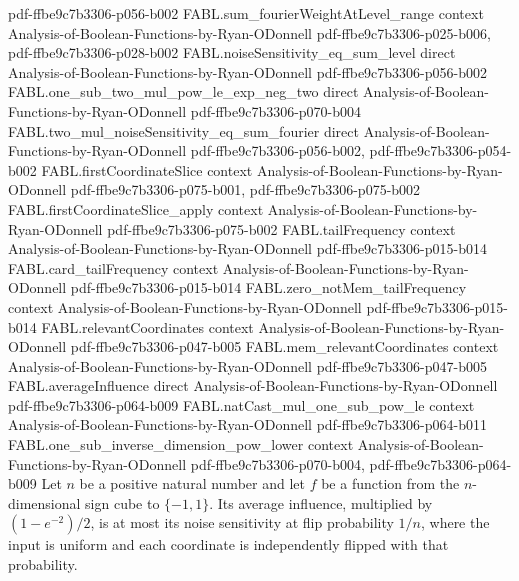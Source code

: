 \begin{theorem}
  {pdf-ffbe9c7b3306-p056-b002}
\proofstep
  {FABL.sum_fourierWeightAtLevel_range}
  {context}
  {Analysis-of-Boolean-Functions-by-Ryan-ODonnell}
  {pdf-ffbe9c7b3306-p025-b006,
    pdf-ffbe9c7b3306-p028-b002}
\proofstep
  {FABL.noiseSensitivity_eq_sum_level}
  {direct}
  {Analysis-of-Boolean-Functions-by-Ryan-ODonnell}
  {pdf-ffbe9c7b3306-p056-b002}
\proofstep
  {FABL.one_sub_two_mul_pow_le_exp_neg_two}
  {direct}
  {Analysis-of-Boolean-Functions-by-Ryan-ODonnell}
  {pdf-ffbe9c7b3306-p070-b004}
\proofstep
  {FABL.two_mul_noiseSensitivity_eq_sum_fourier}
  {direct}
  {Analysis-of-Boolean-Functions-by-Ryan-ODonnell}
  {pdf-ffbe9c7b3306-p056-b002,
    pdf-ffbe9c7b3306-p054-b002}
\proofstep
  {FABL.firstCoordinateSlice}
  {context}
  {Analysis-of-Boolean-Functions-by-Ryan-ODonnell}
  {pdf-ffbe9c7b3306-p075-b001,
    pdf-ffbe9c7b3306-p075-b002}
\proofstep
  {FABL.firstCoordinateSlice_apply}
  {context}
  {Analysis-of-Boolean-Functions-by-Ryan-ODonnell}
  {pdf-ffbe9c7b3306-p075-b002}
\proofstep
  {FABL.tailFrequency}
  {context}
  {Analysis-of-Boolean-Functions-by-Ryan-ODonnell}
  {pdf-ffbe9c7b3306-p015-b014}
\proofstep
  {FABL.card_tailFrequency}
  {context}
  {Analysis-of-Boolean-Functions-by-Ryan-ODonnell}
  {pdf-ffbe9c7b3306-p015-b014}
\proofstep
  {FABL.zero_notMem_tailFrequency}
  {context}
  {Analysis-of-Boolean-Functions-by-Ryan-ODonnell}
  {pdf-ffbe9c7b3306-p015-b014}
\proofstep
  {FABL.relevantCoordinates}
  {context}
  {Analysis-of-Boolean-Functions-by-Ryan-ODonnell}
  {pdf-ffbe9c7b3306-p047-b005}
\proofstep
  {FABL.mem_relevantCoordinates}
  {context}
  {Analysis-of-Boolean-Functions-by-Ryan-ODonnell}
  {pdf-ffbe9c7b3306-p047-b005}
\proofstep
  {FABL.averageInfluence}
  {direct}
  {Analysis-of-Boolean-Functions-by-Ryan-ODonnell}
  {pdf-ffbe9c7b3306-p064-b009}
\proofstep
  {FABL.natCast_mul_one_sub_pow_le}
  {context}
  {Analysis-of-Boolean-Functions-by-Ryan-ODonnell}
  {pdf-ffbe9c7b3306-p064-b011}
\proofstep
  {FABL.one_sub_inverse_dimension_pow_lower}
  {context}
  {Analysis-of-Boolean-Functions-by-Ryan-ODonnell}
  {pdf-ffbe9c7b3306-p070-b004,
    pdf-ffbe9c7b3306-p064-b009}
Let $n$ be a positive natural number and let $f$ be a function from the $n$-dimensional
sign cube to $\{-1,1\}$. Its average influence, multiplied by $(1-e^{-2})/2$, is at most
its noise sensitivity at flip probability $1/n$, where the input is uniform and each
coordinate is independently flipped with that probability.
\end{theorem}

